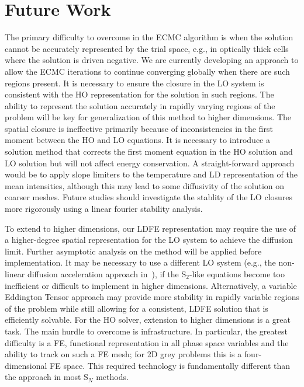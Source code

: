 \section{Future Work} 

The primary difficulty to overcome in the ECMC algorithm is when the solution cannot be
accurately represented by the trial space, e.g., in optically thick cells where the
solution is driven negative.   We are currently developing an approach to allow the ECMC
iterations to continue converging globally when there are such regions present.  It is
necessary to ensure the closure in the LO system is consistent with the HO representation
for the solution in such regions.  The ability to represent the solution accurately in
rapidly varying regions of the problem will be key for generalization of this method to
higher dimensions.  The spatial closure is ineffective primarily because of
inconsistencies in the first moment between the HO and LO equations.  It is necessary to
introduce a solution method that corrects the first moment equation in the HO solution and
LO solution but will not affect energy conservation.  A straight-forward approach would be
to apply slope limiters to the temperature and LD representation of the mean intensities,
although this may lead to some diffusivity of the solution on coarser meshes.  Future
studies should investigate the stablity of the LO closures more rigorously using a linear
fourier stability analysis. 

To extend to higher dimensions, our LDFE representation may require the use of a higher-degree
spatial representation for the LO system to achieve the diffusion
limit. Further asymptotic
analysis on the method will be applied before implementation. It may be necessary to use a different LO system (e.g., the non-linear diffusion
acceleration approach in~\cite{rmc}), if the S$_2$-like equations become too
inefficient or difficult to implement in higher dimensions.  Alternatively, a
variable Eddington Tensor approach may provide more stability in rapidly variable
regions of the problem while still allowing for a consistent, LDFE solution that is efficiently solvable.
For the HO solver, extension to higher dimensions is a great task.  The main hurdle to
overcome is infrastructure.  In particular, the greatest difficulty is a FE, functional
representation in all phase space variables and the ability to
track on such a FE mesh; for 2D grey problems this is a four-dimensional FE space.  This
required technology is fundamentally different than the approach in most S$_N$ methods.

